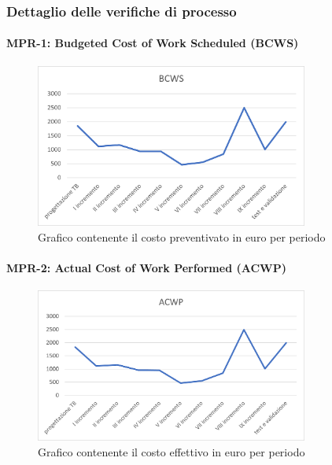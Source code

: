 \subsubsection{Dettaglio delle verifiche di processo}

\paragraph{MPR-1: Budgeted Cost of Work Scheduled (BCWS)}\label{_BCWS}
\begin{center}
    \begin{figure}[!htb]
    \centering
    \includegraphics[width=0.8\textwidth]{res/images/metriche_costi/BCWS.png}
    \caption{Grafico contenente il costo preventivato in euro per periodo}
\end{figure}
\end{center}

\paragraph{MPR-2: Actual Cost of Work Performed (ACWP)}\label{_ACWP}
\begin{center}
    \begin{figure}[!htb]
    \centering
    \includegraphics[width=0.8\textwidth]{res/images/metriche_costi/ACWP.png}
    \caption{Grafico contenente il costo effettivo in euro per periodo}
\end{figure}
\end{center}

